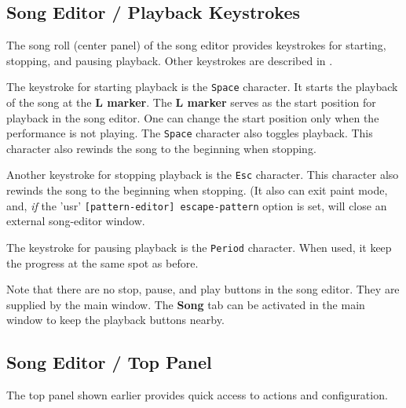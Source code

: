 \subsection{Song Editor / Playback Keystrokes}
\label{subsec:song_editor_playback_keystrokes}

   The song roll (center panel)
   of the song editor provides keystrokes for starting,
   stopping, and pausing playback.
   Other keystrokes are described in
   .


   The keystroke for starting playback is the \texttt{Space} character.
   It starts the playback of the song at the \textbf{L marker}.
   The \textbf{L marker} serves as the start position for playback
   in the song editor.  One can change the start position only when the
   performance is not playing.
   The \texttt{Space} character also toggles playback.
   This character also rewinds the song to the beginning when stopping.

   Another keystroke for stopping playback is the \texttt{Esc} character.
   This character also rewinds the song to the beginning when stopping.
   (It also can exit paint mode, and,
   \textsl{if} the 'usr' \texttt{[pattern-editor] escape-pattern}
   option is set, will close an external song-editor window.

   The keystroke for pausing playback is the \texttt{Period} character.
   When used, it keep the progress at the same spot as before.

   Note that there are no stop, pause, and play buttons in the
   song editor.
   They are supplied by the main window.
   The \textbf{Song} tab can be activated in the main window to
   keep the playback buttons nearby.

\subsection{Song Editor / Top Panel}
\label{subsec:song_editor_top}

   The top panel shown earlier provides quick access to actions
   and configuration.

